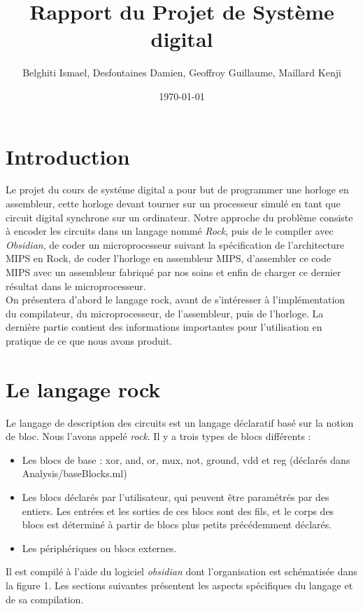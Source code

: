 \documentclass[13pt]{article}
\title{Rapport du Projet de Système digital \no3}
\author{Belghiti Ismael, Desfontaines Damien, Geoffroy Guillaume, Maillard Kenji}
\date{\today}
\begin{document}
\renewcommand{\labelitemi}{$\triangleright$}

\maketitle
\tableofcontents
\newpage
\section{Introduction}
Le projet du cours de systéme digital a pour but de programmer une horloge en
assembleur, cette horloge devant tourner sur un processeur simulé en tant que
circuit digital synchrone sur un ordinateur. Notre approche du problème consiste
à encoder les circuits dans un langage nommé \emph{Rock}, puis de le compiler
avec \emph{Obsidian}, de coder un microprocesseur suivant la spécification de
l'architecture MIPS en Rock, de coder l'horloge en assembleur MIPS, d'assembler
ce code MIPS avec un assembleur fabriqué par nos soins et enfin de charger ce
dernier résultat dans le microprocesseur.\\
On présentera d'abord le langage rock, avant de s'intéresser à l'implémentation
du compilateur, du microprocesseur, de l'assembleur, puis de l'horloge. La
dernière partie contient des informations importantes pour l'utilisation en
pratique de ce que nous avons produit. 


\section{Le langage rock}

Le langage de description des circuits est un langage déclaratif basé sur la
notion de bloc. Nous l'avons appelé \emph{rock}. Il y a trois types de blocs différents :
\begin{itemize}
\item Les blocs de base : xor, and, or, mux, not, ground, vdd et reg (déclarés dans Analysis/baseBlocks.ml)
\item Les blocs déclarés par l'utilisateur, qui peuvent être paramétrés par des
entiers. Les entrées et les sorties de ces blocs sont des fils, et le corps des
blocs est déterminé à partir de blocs plus petits précédemment déclarés. 
\item Les périphériques ou blocs externes.
\end{itemize}

Il est compilé à l'aide du logiciel \emph{obsidian} dont l'organisation est
schématisée dans la figure 1. Les sections suivantes présentent les aspects spécifiques du langage et de sa compilation.
\end{document}
